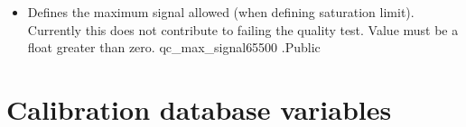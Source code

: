 \begin{itemize}
\item {} 
{Defines the maximum signal allowed (when defining saturation limit). Currently this does not contribute to failing the quality test. Value must be a float greater than zero.}
{qc\_max\_signal}{65500}
{\calextractRAW}{\constantsfile}{\calextractRAW.\progMAIN}{Public}


\end{itemize}







\clearpage
\newpage
\section{Calibration database variables}
\label{ch:variables:calibdb}

